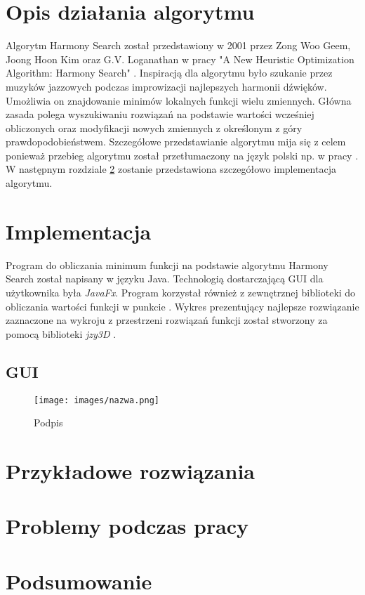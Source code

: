 \documentclass[10pt, a4paper]{article}
\begin{document}
\section{Opis działania algorytmu}
\label{sec:opis}
Algorytm Harmony Search został przedstawiony w 2001 przez Zong Woo Geem, Joong Hoon Kim oraz G.V. Loganathan w pracy "A New Heuristic Optimization Algorithm: Harmony Search" \cite{bib:orginal}. Inspiracją dla algorytmu było szukanie przez muzyków jazzowych podczas improwizacji najlepszych harmonii dźwięków. Umożliwia on znajdowanie minimów lokalnych funkcji wielu zmiennych. Główna zasada polega wyszukiwaniu rozwiązań na podstawie wartości wcześniej obliczonych oraz modyfikacji nowych zmiennych z określonym z góry prawdopodobieństwem. Szczegółowe przedstawianie algorytmu mija się z celem ponieważ przebieg algorytmu został przetłumaczony na język polski np. w pracy \cite{bib:tlumaczenie}. W następnym rozdziale \ref{sec:implementacja} zostanie przedstawiona szczegółowo implementacja algorytmu. 

\section{Implementacja}
\label{sec:implementacja}
Program do obliczania minimum funkcji na podstawie algorytmu Harmony Search został napisany w języku Java. Technologią dostarczającą GUI dla użytkownika była {\em JavaFx}. Program korzystał również z zewnętrznej biblioteki do obliczania wartości funkcji w punkcie \cite{bib:mathparser}. Wykres prezentujący najlepsze rozwiązanie zaznaczone na wykroju z przestrzeni rozwiązań funkcji został stworzony za pomocą biblioteki {\em jzy3D} \cite{bib:jzy3d}.
\subsection{GUI}
\label{subsub:gui}

\begin{figure}[htbp]
	\centering
	\texttt{[image: images/nazwa.png]}
	\caption{Podpis}
	\label{fig:nazwa}
\end{figure}


\section{Przykładowe rozwiązania}
\label{sec:przyklady}

\section{Problemy podczas pracy}
\label{sec:problemy}

\section{Podsumowanie}
\label{sec:podsumowanie}

\newpage



\end{document}
